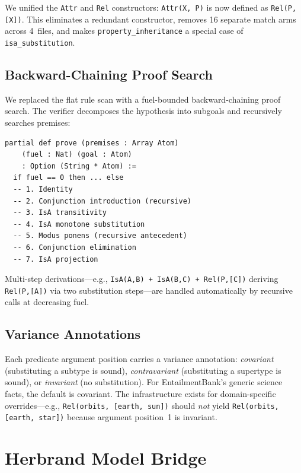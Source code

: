 \documentclass[]{article}
\newcommand{\code}[1]{\texttt{#1}}
\begin{document}
We unified the
\code{Attr} and \code{Rel} constructors: \code{Attr(X, P)} is now
defined as \code{Rel(P, [X])}.  This eliminates a redundant constructor,
removes 16 separate match arms across 4~files, and makes
\code{property\_inheritance} a special case of \code{isa\_substitution}.

\subsection{Backward-Chaining Proof Search}

We replaced the flat rule scan with a fuel-bounded backward-chaining
proof search.  The verifier decomposes the hypothesis into subgoals and
recursively searches premises:

\begin{lstlisting}
partial def prove (premises : Array Atom)
    (fuel : Nat) (goal : Atom)
    : Option (String * Atom) :=
  if fuel == 0 then ... else
  -- 1. Identity
  -- 2. Conjunction introduction (recursive)
  -- 3. IsA transitivity
  -- 4. IsA monotone substitution
  -- 5. Modus ponens (recursive antecedent)
  -- 6. Conjunction elimination
  -- 7. IsA projection
\end{lstlisting}

Multi-step derivations---e.g., \code{IsA(A,B) + IsA(B,C) + Rel(P,[C])}
deriving \code{Rel(P,[A])} via two substitution steps---are handled
automatically by recursive calls at decreasing fuel.

\subsection{Variance Annotations}

Each predicate argument position carries a variance annotation:
\emph{covariant} (substituting a subtype is sound),
\emph{contravariant} (substituting a supertype is sound), or
\emph{invariant} (no substitution).  For EntailmentBank's generic
science facts, the default is covariant.  The infrastructure exists
for domain-specific overrides---e.g., \code{Rel(orbits, [earth, sun])}
should \emph{not} yield \code{Rel(orbits, [earth, star])} because
argument position~1 is invariant.

\section{Herbrand Model Bridge}
\label{sec:herbrand}
\end{document}
